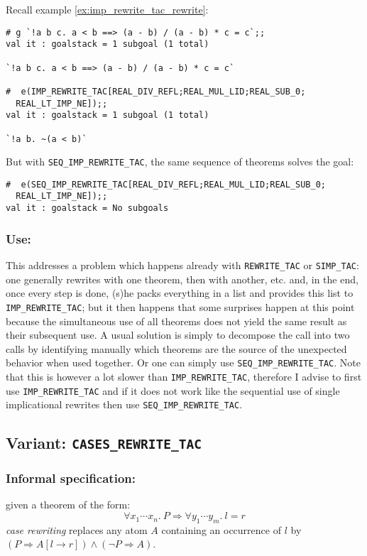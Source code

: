 \documentclass{llncs}
\newcommand*\IMPREWRITETAC{\texttt{IMP\_REWRITE\_TAC}\xspace}
\newcommand*\SEQIMPREWRITETAC{\texttt{SEQ\_IMP\_REWRITE\_TAC}\xspace}
\newcommand*\REWRITETAC{\texttt{REWRITE\_TAC}\xspace}
\newcommand*\SIMPTAC{\texttt{SIMP\_TAC}\xspace}
\newcommand*\CASETAC{\texttt{CASES\_REWRITE\_TAC}\xspace}
\begin{document}
    \begin{example}
      Recall example \ref{ex:imp_rewrite_tac_rewrite}:
        \begin{verbatim}
# g `!a b c. a < b ==> (a - b) / (a - b) * c = c`;;
val it : goalstack = 1 subgoal (1 total)

`!a b c. a < b ==> (a - b) / (a - b) * c = c`

#  e(IMP_REWRITE_TAC[REAL_DIV_REFL;REAL_MUL_LID;REAL_SUB_0;
  REAL_LT_IMP_NE]);;
val it : goalstack = 1 subgoal (1 total)

`!a b. ~(a < b)` \end{verbatim}
        But with \SEQIMPREWRITETAC, the same sequence of theorems solves the goal:
        \begin{verbatim}
#  e(SEQ_IMP_REWRITE_TAC[REAL_DIV_REFL;REAL_MUL_LID;REAL_SUB_0;
  REAL_LT_IMP_NE]);;
val it : goalstack = No subgoals \end{verbatim}
      \end{example}

    \subsubsection{Use:}
    This addresses a problem which happens already with \REWRITETAC or \SIMPTAC:
    one generally rewrites with one theorem, then with another, etc.
    and, in the end, once every step is done, (s)he packs everything in a list and provides this list
    to \IMPREWRITETAC; but it then happens that some surprises happen at this point
    because the simultaneous use of all theorems does not yield the same result as their subsequent use.
    A usual solution is simply to decompose the call into two calls by identifying manually
    which theorems are the source of the unexpected behavior when used together.
    Or one can simply use \SEQIMPREWRITETAC.
    Note that this is however a lot slower than \IMPREWRITETAC,
    therefore I advise to first use \IMPREWRITETAC and if it does not work like the sequential use of
    single implicational rewrites then use \SEQIMPREWRITETAC.

  \subsection{Variant: \CASETAC}
		\subsubsection{Informal specification:}
		given a theorem of the form:
    \[\forall x_1\cdots x_n.\ P \Rightarrow \forall y_1\cdots y_m.\ l = r\]
    \emph{case rewriting} replaces any atom $A$ containing an occurrence of $l$
    by $(P \Rightarrow A[l\to r]) \wedge (\neg P \Rightarrow A)$.
\end{document}

